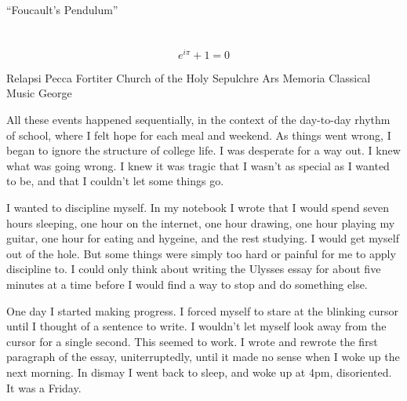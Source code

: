 ``Foucault's Pendulum''

\section{}


\begin{equation}
  e^{i\pi} + 1 = 0
\end{equation}
      
Relapsi
Pecca Fortiter
Church of the Holy Sepulchre
Ars Memoria
Classical Music
George

All these events happened sequentially, in the context of the day-to-day rhythm
of school, where I felt hope for each meal and weekend.  As things went wrong, I
began to ignore the structure of college life.  I was desperate for a way out.
I knew what was going wrong.  I knew it was tragic that I wasn't as special as I
wanted to be, and that I couldn't let some things go.

I wanted to discipline myself.  In my notebook I wrote that I would spend seven
hours sleeping, one hour on the internet, one hour drawing, one hour playing my
guitar, one hour for eating and hygeine, and the rest studying.  I would get
myself out of the hole.  But some things were simply too hard or painful for me
to apply discipline to.  I could only think about writing the Ulysses essay for
about five minutes at a time before I would find a way to stop and do something
else.

One day I started making progress.  I forced myself to stare at the blinking
cursor until I thought of a sentence to write.  I wouldn't let myself look away
from the cursor for a single second.  This seemed to work.  I wrote and rewrote
the first paragraph of the essay, uniterruptedly, until it made no sense when I
woke up the next morning.  In dismay I went back to sleep, and woke up at 4pm,
disoriented.  It was a Friday.

\section{}

